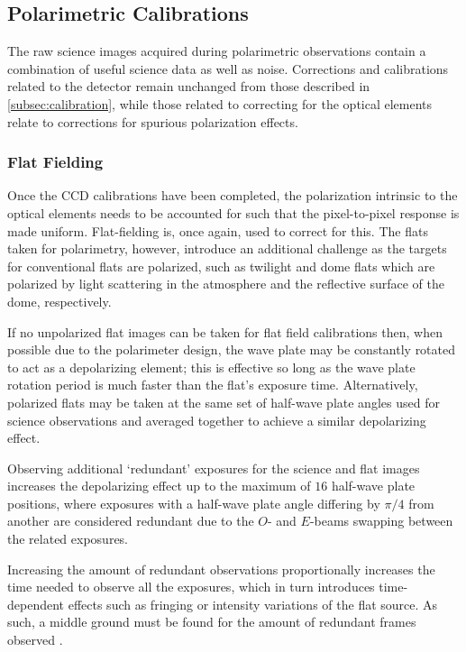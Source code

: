\subsection{Polarimetric Calibrations} \label{subsec:pol_cal}

The raw science images acquired during polarimetric observations contain a combination of useful science data as well as noise.
Corrections and calibrations related to the detector remain unchanged from those described in \autoref{subsec:calibration}, while those related to correcting for the optical elements relate to corrections for spurious polarization effects.

\subsubsection{Flat Fielding} \label{subsubsec:pol_flat}

Once the \gls{CCD} calibrations have been completed, the polarization intrinsic to the optical elements needs to be accounted for such that the pixel-to-pixel response is made uniform.
Flat-fielding is, once again, used to correct for this.
The flats taken for polarimetry, however, introduce an additional challenge as the targets for conventional flats are polarized, such as twilight and dome flats which are polarized by light scattering in the atmosphere and the reflective surface of the dome, respectively.

If no unpolarized flat images can be taken for flat field calibrations then, when possible due to the polarimeter design, the wave plate may be constantly rotated to act as a depolarizing element; this is effective so long as the wave plate rotation period is much faster than the flat's exposure time.
Alternatively, polarized flats may be taken at the same set of half-wave plate angles used for science observations and averaged together to achieve a similar depolarizing effect.

Observing additional `redundant' exposures for the science and flat images increases the depolarizing effect up to the maximum of $16$ half-wave plate positions, where exposures with a half-wave plate angle differing by $\pi / 4$ from another are considered redundant due to the $O$- and $E$-beams swapping between the related exposures.

Increasing the amount of redundant observations proportionally increases the time needed to observe all the exposures, which in turn introduces time-dependent effects such as fringing or intensity variations of the flat source.
As such, a middle ground must be found for the amount of redundant frames observed \citep{polarimetry_error, pol_optimize}.

